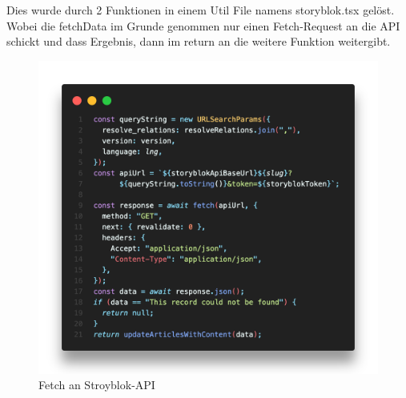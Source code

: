 Dies wurde durch 2 Funktionen in einem Util File namens storyblok.tsx gelöst. 
Wobei die fetchData im Grunde genommen nur einen Fetch-Request an die API schickt und dass Ergebnis, dann im return an die weitere Funktion weitergibt.
\begin{figure}[H]
    \centering
    \includegraphics[width=\linewidth]{pics/sb-fetch-01.png}
    \caption{Fetch an Stroyblok-API}
\end{figure}

